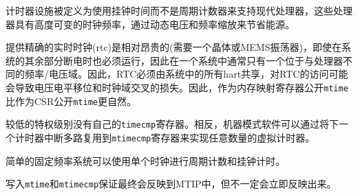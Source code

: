 {\iffalse
\begin{commentary}
	The timer facility is defined to use wall-clock time rather than a
	cycle counter to support modern processors that run with a highly
	variable clock frequency to save energy through dynamic voltage and
	frequency scaling.

	Accurate real-time clocks (RTCs) are relatively expensive to provide
	(requiring a crystal or MEMS oscillator) and have to run even when the
	rest of system is powered down, and so there is usually only one in a
	system located in a different frequency/voltage domain from the
	processors.  Hence, the RTC must be shared by all the harts in a
	system and accesses to the RTC will potentially incur the penalty of a
	voltage-level-shifter and clock-domain crossing.  It is thus more
	natural to expose {\tt mtime} as a memory-mapped register than as a CSR.

	Lower privilege levels do not have their own {\tt timecmp} registers.
	Instead, machine-mode software can implement any number of virtual timers on
	a hart by multiplexing the next timer interrupt into the {\tt mtimecmp}
	register.

	Simple fixed-frequency systems can use a single clock for both cycle
	counting and wall-clock time.
\end{commentary}
\fi
计时器设施被定义为使用挂钟时间而不是周期计数器来支持现代处理器，这些处理器具有高度可变的时钟频率，通过动态电压和频率缩放来节省能源。

提供精确的实时时钟(rtc)是相对昂贵的(需要一个晶体或MEMS振荡器)，即使在系统的其余部分断电时也必须运行，因此在一个系统中通常只有一个位于与处理器不同的频率/电压域。因此，RTC必须由系统中的所有hart共享，对RTC的访问可能会导致电压电平移位和时钟域交叉的损失。因此，作为内存映射寄存器公开{\tt mtime}比作为CSR公开{\tt mtime}更自然。

较低的特权级别没有自己的{\tt timecmp}寄存器。相反，机器模式软件可以通过将下一个计时器中断多路复用到{\tt mtimecmp}寄存器来实现任意数量的虚拟计时器。

简单的固定频率系统可以使用单个时钟进行周期计数和挂钟计时。

\iffalse
Writes to {\tt mtime} and {\tt mtimecmp} are guaranteed to be reflected in
MTIP eventually, but not necessarily immediately.
\fi
写入{\tt mtime}和{\tt mtimecmp}保证最终会反映到MTIP中，但不一定会立即反映出来。

}
